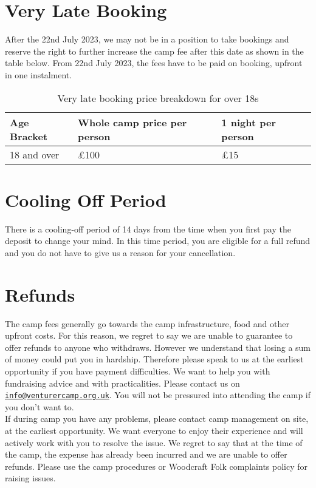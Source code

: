 \section{Very Late Booking}
After the 22nd July 2023, we may not be in a position to take bookings and reserve the right to further increase the camp fee after this date as shown in the table below. From 22nd July 2023, the fees have to be paid on booking, upfront in one instalment. 
\begin{table}[H]
    \centering   
    \begin{tabularx}{0.9\textwidth}{XXX}
        \textbf{Age Bracket} & \textbf{Whole camp price per person} & \textbf{1 night per person} \\
        \hline
        \hline
        18 and over & £100 & £15\\
        \hline
    \end{tabularx}
    \caption{Very late booking price breakdown for over 18s}
\end{table}

\section{Cooling Off Period}
There is a cooling-off period of 14 days from the time when you first pay the deposit to change your mind. In this time period, you are eligible for a full refund and you do not have to give us a reason for your cancellation. 

\section{Refunds}
The camp fees generally go towards the camp infrastructure, food and other upfront costs.  For this reason, we regret to say we are unable to guarantee to offer refunds to anyone who withdraws. However we understand that losing a sum of money could put you in hardship. Therefore please speak to us at the earliest opportunity if you have payment difficulties. We want to help you with fundraising advice and with practicalities. Please contact us on \href{mailto:info@venturercamp.org.uk}{\texttt{info@venturercamp.org.uk}}. You will not be pressured into attending the camp if you don't want to.\\[1em] 
If during camp you have any problems, please contact camp management on site, at the earliest opportunity. We want everyone to enjoy their experience and will actively work with you to resolve the issue. We regret to say that at the time of the camp, the expense has already been incurred and we are unable to offer refunds. Please use the camp procedures or Woodcraft Folk complaints policy for raising issues.
